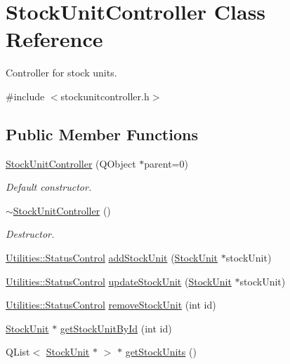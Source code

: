\hypertarget{class_stock_unit_controller}{\section{\-Stock\-Unit\-Controller \-Class \-Reference}
\label{class_stock_unit_controller}
}


\-Controller for stock units.  




{\ttfamily \#include $<$stockunitcontroller.\-h$>$}

\subsection*{\-Public \-Member \-Functions}
\begin{DoxyCompactItemize}
\item 
\hyperlink{class_stock_unit_controller_aeabfe324acdb8bce667e99862f2ac491}{\-Stock\-Unit\-Controller} (\-Q\-Object $\ast$parent=0)
\begin{DoxyCompactList}\small\item\em \-Default constructor. \end{DoxyCompactList}\item 
\hyperlink{class_stock_unit_controller_aff0ac3b777e48da87d993c6d5287c4b5}{$\sim$\-Stock\-Unit\-Controller} ()
\begin{DoxyCompactList}\small\item\em \-Destructor. \end{DoxyCompactList}\item 
\hyperlink{class_utilities_a2974f062d85bdb0c444a1cbe554bf228}{\-Utilities\-::\-Status\-Control} \hyperlink{class_stock_unit_controller_ac75b259718609efe6f077bf2233cc4a6}{add\-Stock\-Unit} (\hyperlink{class_stock_unit}{\-Stock\-Unit} $\ast$stock\-Unit)
\item 
\hyperlink{class_utilities_a2974f062d85bdb0c444a1cbe554bf228}{\-Utilities\-::\-Status\-Control} \hyperlink{class_stock_unit_controller_a5753ef4120d7fbd16e5fa28ffc74b123}{update\-Stock\-Unit} (\hyperlink{class_stock_unit}{\-Stock\-Unit} $\ast$stock\-Unit)
\item 
\hyperlink{class_utilities_a2974f062d85bdb0c444a1cbe554bf228}{\-Utilities\-::\-Status\-Control} \hyperlink{class_stock_unit_controller_ae68a7652e3d55532342e0847a441a64f}{remove\-Stock\-Unit} (int id)
\item 
\hyperlink{class_stock_unit}{\-Stock\-Unit} $\ast$ \hyperlink{class_stock_unit_controller_a249fe2cffae702675436a9ae02413018}{get\-Stock\-Unit\-By\-Id} (int id)
\item 
\-Q\-List$<$ \hyperlink{class_stock_unit}{\-Stock\-Unit} $\ast$ $>$ $\ast$ \hyperlink{class_stock_unit_controller_a02c4920ecb6dcda170754b8654516175}{get\-Stock\-Units} ()
\end{DoxyCompactItemize}


